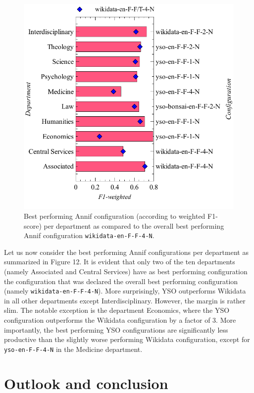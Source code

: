\begin{figure}
\centering
\includegraphics{images/metrics_dept_summary.pdf}
\caption{Best performing Annif configuration (according to weighted
F1-score) per department as compared to the overall best performing
Annif configuration \texttt{wikidata-en-F-F-4-N}.}
\end{figure}

Let us now consider the best performing Annif configurations per
department as summarized in Figure 12. It is evident that only two of
the ten departments (namely Associated and Central Services) have as
best performing configuration the configuration that was declared the
overall best performing configuration (namely
\texttt{wikidata-en-F-F-4-N}). More surprisingly, YSO outperforms
Wikidata in all other departments except Interdisciplinary. However, the
margin is rather slim. The notable exception is the department
Economics, where the YSO configuration outperforms the Wikidata
configuration by a factor of 3. More importantly, the best performing
YSO configurations are significantly less productive than the slightly
worse performing Wikidata configuration, except for
\texttt{yso-en-F-F-4-N} in the Medicine department.

\hypertarget{outlook-and-conclusion}{%
\section{Outlook and conclusion}\label{outlook-and-conclusion}}

